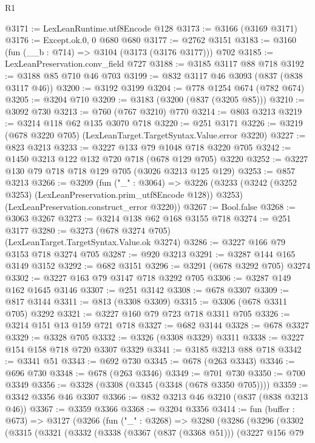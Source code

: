 \begin{lexlean}{R1}
\begin{coremodule}
@3171 := LexLeanRuntime.utf8Encode @128
@3173 := @3166 (@3169 @3171)
@3176 := Except.ok.{0, 0} @680 @680
@3177 := @2762 @3151
@3183 := @3160 (fun (__b : @714) => @3104 (@3173 (@3176 @3177))) @702
@3185 := LexLeanPreservation.conv_field @727
@3188 := @3185 @3117 @88 @718
@3192 := @3188 @85 @710 @46 @703
@3199 := @832 @3117 @46 @3093 (@837 (@838 @3117 @46))
@3200 := @3192 @3199
@3204 := @778 @1254 @674 (@782 @674)
@3205 := @3204 @710
@3209 := @3183 (@3200 (@837 (@3205 @85)))
@3210 := @3092 @730
@3213 := @760 (@767 @3210) @770
@3214 := @803 @3213
@3219 := @3214 @118 @62 @135 @3070 @718
@3220 := @251 @3171
@3226 := @3219 (@678 @3220 @705) (LexLeanTarget.TargetSyntax.Value.error @3220)
@3227 := @823 @3213
@3233 := @3227 @133 @79 @1048 @718 @3220 @705
@3242 := @1450 @3213 @122 @132 @720 @718 (@678 @129 @705) @3220
@3252 := @3227 @130 @79 @718 @718 @129 @705 (@3026 @3213 @125 @129)
@3253 := @857 @3213
@3266 := @3209
    (fun ("_" : @3064) =>
    @3226
      (@3233 (@3242 (@3252 @3253) (LexLeanPreservation.prim_utf8Encode @128)) @3253)
      (LexLeanPreservation.construct_error @3220))
@3267 := Bool.false
@3268 := @3063 @3267
@3273 := @3214 @138 @62 @168 @3155 @718
@3274 := @251 @3177
@3280 := @3273 (@678 @3274 @705) (LexLeanTarget.TargetSyntax.Value.ok @3274)
@3286 := @3227 @166 @79 @3153 @718 @3274 @705
@3287 := @920 @3213
@3291 := @3287 @144 @165 @3149 @3152
@3292 := @682 @3151
@3296 := @3291 (@678 @3292 @705) @3274
@3302 := @3227 @163 @79 @3147 @718 @3292 @705
@3306 := @3287 @149 @162 @1645 @3146
@3307 := @251 @3142
@3308 := @678 @3307
@3309 := @817 @3144
@3311 := @813 (@3308 @3309)
@3315 := @3306 (@678 @3311 @705) @3292
@3321 := @3227 @160 @79 @723 @718 @3311 @705
@3326 := @3214 @151 @13 @159 @721 @718
@3327 := @682 @3144
@3328 := @678 @3327
@3329 := @3328 @705
@3332 := @3326 (@3308 @3329) @3311
@3338 := @3227 @154 @158 @718 @720 @3307 @3329
@3341 := @3185 @3213 @88 @718
@3342 := @3341 @51
@3343 := @692 @730
@3345 := @678 (@263 @3343)
@3346 := @696 @730
@3348 := @678 (@263 @3346)
@3349 := @701 @730
@3350 := @700 @3349
@3356 := @3328 (@3308 (@3345 (@3348 (@678 @3350 @705))))
@3359 := @3342 @3356 @46 @3307
@3366 := @832 @3213 @46 @3210 (@837 (@838 @3213 @46))
@3367 := @3359 @3366
@3368 := @3204 @3356
@3414 := fun (buffer : @673) =>
  @3127
    (@3266
      (fun ("_" : @3268) =>
      @3280
        (@3286
          (@3296
            (@3302
              (@3315
                (@3321
                  (@3332
                    (@3338
                      (@3367 (@837 (@3368 @51)))
                      (@3227
                        @156
                        @79

\end{coremodule}
\end{lexlean}
